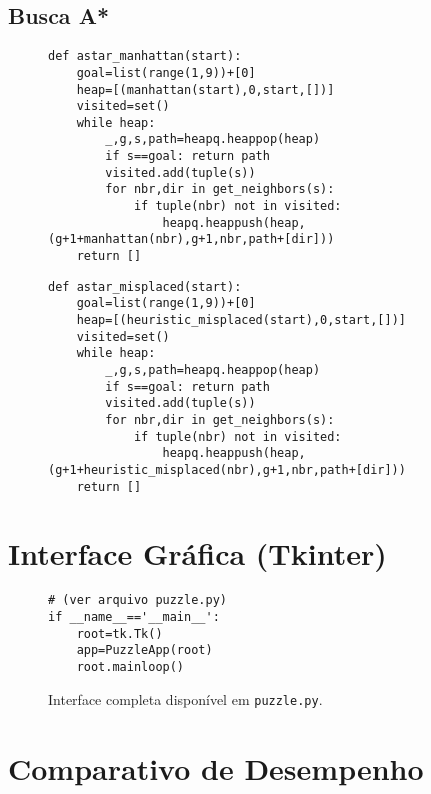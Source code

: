 \documentclass[sigconf]{acmart}
\begin{document}
\subsection{Busca A*}
\begin{figure}[H]
\centering
\begin{lstlisting}[caption={Implementação A* (Manhattan)}]
def astar_manhattan(start):
    goal=list(range(1,9))+[0]
    heap=[(manhattan(start),0,start,[])]
    visited=set()
    while heap:
        _,g,s,path=heapq.heappop(heap)
        if s==goal: return path
        visited.add(tuple(s))
        for nbr,dir in get_neighbors(s):
            if tuple(nbr) not in visited:
                heapq.heappush(heap,(g+1+manhattan(nbr),g+1,nbr,path+[dir]))
    return []
\end{lstlisting}
\begin{lstlisting}[caption={Implementação A* (Peças Fora)}]
def astar_misplaced(start):
    goal=list(range(1,9))+[0]
    heap=[(heuristic_misplaced(start),0,start,[])]
    visited=set()
    while heap:
        _,g,s,path=heapq.heappop(heap)
        if s==goal: return path
        visited.add(tuple(s))
        for nbr,dir in get_neighbors(s):
            if tuple(nbr) not in visited:
                heapq.heappush(heap,(g+1+heuristic_misplaced(nbr),g+1,nbr,path+[dir]))
    return []
\end{lstlisting}
\end{figure}

\section{Interface Gráfica (Tkinter)}
\begin{figure}[H]
\centering
\begin{lstlisting}[caption={Código da interface}] 
# (ver arquivo puzzle.py)
if __name__=='__main__':
    root=tk.Tk()
    app=PuzzleApp(root)
    root.mainloop()
\end{lstlisting}
\caption*{Interface completa disponível em \texttt{puzzle.py}.}
\end{figure}

\section{Comparativo de Desempenho}
\begin{table}[H]
\centering
\caption{Desempenho dos Algoritmos}
\end{table}
\end{document}
